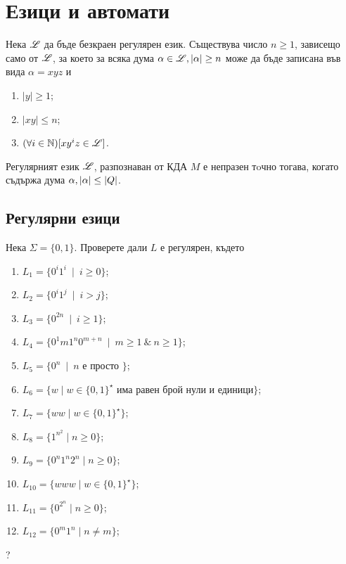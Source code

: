 \chapter{Езици и автомати}

\begin{lemma}
  Нека $\mathscr{L}$ да бъде безкраен регулярен език.
  Съществува число $n\geq 1$, зависещо само от $\mathscr{L}$, 
  за което за всяка дума $\alpha\in \mathscr{L}, \vert{\alpha}\vert\geq n$ може да 
  бъде записана във вида $\alpha = xyz$ и 
  \begin{enumerate}
  \item
    $|y|\geq 1$;
  \item
    $|xy|\leq n$;
  \item
    $(\forall i\in\mathbb{N})[xy^iz \in \mathscr{L}]$.
  \end{enumerate}
\end{lemma}

\begin{crl}
  Регулярният език $\mathscr{L}$, 
  разпознаван от КДА $M$ е непразен тoчно тогава, когато съдържа дума $\alpha, \vert{\alpha}\vert \leq \vert{Q}\vert$.
\end{crl}

\section{Регулярни езици}
\begin{problem}
  Нека $\Sigma = \{0,1\}$.  Проверете дали $L$ е регулярен, където
  \begin{enumerate}[1)]
  \item
    $L_1 = \{0^i1^i\ \mid\ i\geq 0\}$;
  \item
    $L_2 = \{0^i1^j\ \mid\ i > j\}$;
  \item
    $L_3 = \{0^{2n}\ \mid\ i\geq 1\}$;
  \item
    $L_4 = \{0^1m1^n0^{m+n}\ \mid\ m\geq 1\ \&\ n\geq 1\}$;
  \item
    $L_5 = \{0^n\ \mid\ n\mbox{ е просто }\}$;
  \item
    $L_6 = \{w\mid w\in\{0,1\}^\star\mbox{ има равен брой нули и единици}\}$;
  \item
    $L_7 = \{ww\mid w\in\{0,1\}^\star\}$;
  \item
    $L_8 = \{1^{n^2}\mid n\geq 0\}$;
  \item
    $L_{9} = \{0^n1^n2^n\mid n\geq 0\}$;
  \item
    $L_{10} = \{www\mid w\in \{0,1\}^\star\}$;
  \item
    $L_{11} = \{0^{2^n}\mid n\geq 0\}$;
  \item
    $L_{12} = \{0^m1^n\mid n\neq m\}$;
  \end{enumerate}
\end{problem}


?